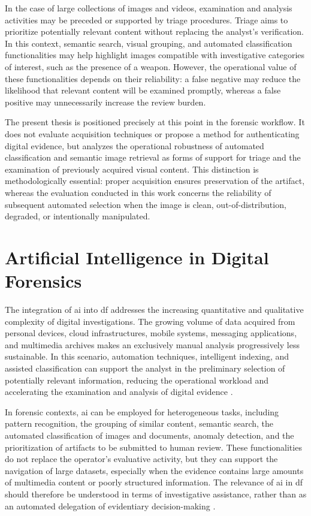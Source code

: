 In the case of large collections of images and videos, examination and analysis
activities may be preceded or supported by triage procedures. Triage aims to
prioritize potentially relevant content without replacing the analyst's
verification. In this context, semantic search, visual grouping, and automated
classification functionalities may help highlight images compatible with
investigative categories of interest, such as the presence of a weapon.
However, the operational value of these functionalities depends on their
reliability: a false negative may reduce the likelihood that relevant content
will be examined promptly, whereas a false positive may unnecessarily increase
the review burden.

The present thesis is positioned precisely at this point in the forensic
workflow. It does not evaluate acquisition techniques or propose a method for
authenticating digital evidence, but analyzes the operational robustness of
automated classification and semantic image retrieval as forms of support for
triage and the examination of previously acquired visual content. This
distinction is methodologically essential: proper acquisition ensures
preservation of the artifact, whereas the evaluation conducted in this work
concerns the reliability of subsequent automated selection when the image is
clean, out-of-distribution, degraded, or intentionally manipulated.


\section{Artificial Intelligence in Digital Forensics}
\label{sec:background_ai_digital_forensics}
The integration of \gls{ai} into \gls{df} addresses the increasing
quantitative and qualitative complexity of digital investigations. The growing
volume of data acquired from personal devices, cloud infrastructures, mobile
systems, messaging applications, and multimedia archives makes an exclusively
manual analysis progressively less sustainable. In this scenario, automation
techniques, intelligent indexing, and assisted classification can support the
analyst in the preliminary selection of potentially relevant information,
reducing the operational workload and accelerating the examination and analysis
of digital evidence \cite{garfinkel2010digital,costantini2019digital}.

In forensic contexts, \gls{ai} can be employed for heterogeneous tasks,
including pattern recognition, the grouping of similar content, semantic search,
the automated classification of images and documents, anomaly detection, and
the prioritization of artifacts to be submitted to human review. These
functionalities do not replace the operator's evaluative activity, but they can
support the navigation of large datasets, especially when the evidence contains
large amounts of multimedia content or poorly structured information. The
relevance of \gls{ai} in \gls{df} should therefore be understood in terms of
investigative assistance, rather than as an automated delegation of evidentiary
decision-making \cite{costantini2019digital,faqir2023digital}.

